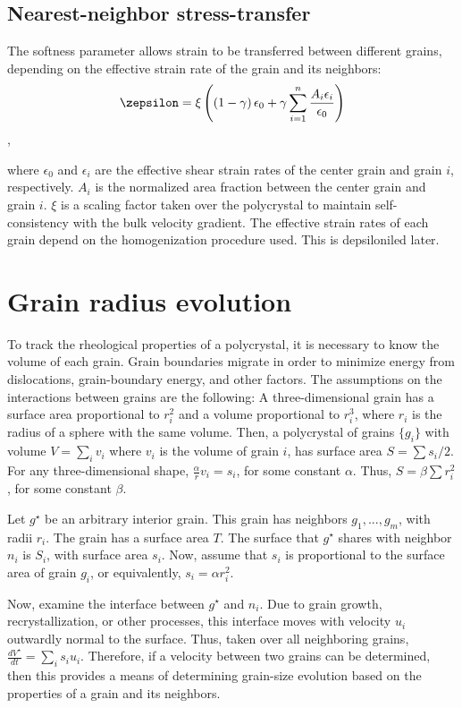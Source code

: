 \documentclass{igs}
\begin{document}
\subsection{Nearest-neighbor stress-transfer}
The softness parameter allows strain to be transferred between different grains, depending on the effective strain rate of the grain and its neighbors:
\begin{equation}
\zepsilon = \xi \left( \left( 1 - \gamma \right)  \epsilon_0 + \gamma \sum_{i=1}^n \frac{A_i \epsilon_i}{\epsilon_0} \right)
\end{equation},

where $\epsilon_0$ and $\epsilon_i$ are the effective shear strain rates of the center grain and grain $i$, respectively. $A_i$ is the normalized area fraction between the center grain and grain $i$. $\xi$ is a scaling factor taken over the polycrystal to maintain self-consistency with the bulk velocity gradient. The effective strain rates of each grain depend on the homogenization procedure used. This is depsiloniled later.

\section{Grain radius evolution}
To track the rheological properties of a polycrystal, it is necessary to know the volume of each grain. Grain boundaries migrate in order to minimize energy from dislocations, grain-boundary energy, and other factors. The assumptions on the interactions between grains are the following: A three-dimensional grain has a surface area proportional to $r^2_i$ and a volume proportional to $r^3_i$, where $r_i$ is the radius of a sphere with the same volume. Then, a polycrystal of grains $\{g_i\}$ with volume $V=\sum_i v_i$ where $v_i$ is the volume of grain $i$, has surface area $S=\sum s_i/2$. For any three-dimensional shape, $\frac{\alpha}{r} v_i =  s_i$, for some constant $\alpha$. Thus, $S=\beta \sum r_i^2$, for some constant $\beta$.

Let $g^{\star}$ be an arbitrary interior grain. This grain has neighbors $g_1,...,g_m$, with radii $r_i$. The grain has a surface area $T$. The surface that $g^{\star}$ shares with neighbor $n_i$ is $S_i$, with surface area $s_i$. Now, assume that $s_i$ is proportional to the surface area of grain $g_i$, or equivalently, $s_i=\alpha r_i^2$.

Now, examine the interface between $g^{\star}$ and $n_i$. Due to grain growth, recrystallization, or other processes, this interface moves with velocity $u_i$ outwardly normal to the surface. Thus, taken over all neighboring grains, $\frac{dV^{\star}}{dt}=\sum_{i}s_i u_i$. Therefore, if a velocity between two grains can be determined, then this provides a means of determining grain-size evolution based on the properties of a grain and its neighbors.
\end{document}
